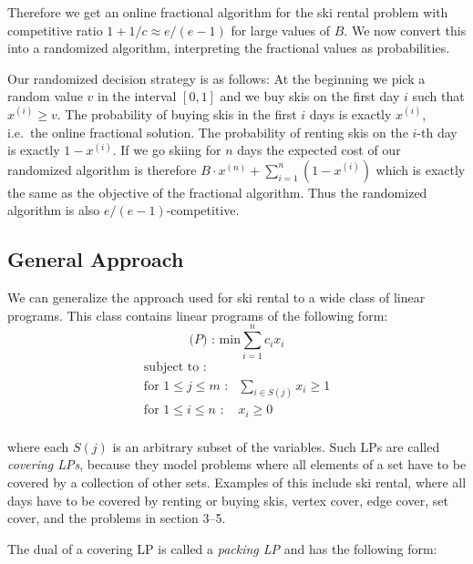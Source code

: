Therefore we get an online fractional algorithm for the ski rental problem with competitive ratio $1+1/c \approx e/(e-1)$ for large values of $B$.
We now convert this into a randomized algorithm, interpreting the fractional values as probabilities.

Our randomized decision strategy is as follows: At the beginning we pick a random value $v$ in the interval $[0,1]$ and we buy skis on the first day $i$ such that $x^{(i)} \ge v$.
The probability of buying skis in the first $i$ days is exactly $x^{(i)}$, i.e.\ the online fractional solution. The probability of renting skis on the $i$-th day is exactly $1-x^{(i)}$.
If we go skiing for $n$ days the expected cost of our randomized algorithm is therefore $B \cdot  x^{(n)} + \sum_{i=1}^n(1-x^{(i)})$ which is exactly the same as the objective of the fractional algorithm.
Thus the randomized algorithm is also $e/(e-1)$-competitive.

\subsection{General Approach}
\label{section:general_approach}
We can generalize the approach used for ski rental to a wide class of linear programs.
This class contains linear programs of the following form:
\[
\textrm{($P$) : min}  \sum_{i=1}^n c_i x_i
\]
\[
	\begin{array}{lr}
	\textrm{subject to :} & \\
	\textrm{for $1 \le j \le m$} \textrm{ :} & \sum_{i \in S(j)} x_i  \ge 1  \\
	\textrm{for $1 \le i \le n$} \textrm{ :} & x_i  \ge 0  \\

	\end{array}
\]

where each $S(j)$ is an arbitrary subset of the variables.
Such LPs are called \emph{covering LPs}, because they model problems where all elements of a set have to be covered by a collection of other sets.
Examples of this include ski rental, where all days have to be covered by renting or buying skis, vertex cover, edge cover, set cover, and the problems in section 3--5.

The dual of a covering LP is called a \emph{packing LP} and has the following form:

